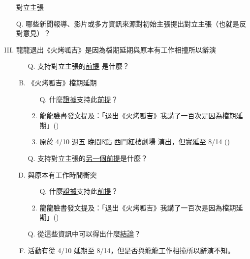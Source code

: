\documentclass[a4paper, 12pt]{article}
\begin{document}
\begin{enumerate}[I.]
\begin{enumerate}[A.]
\begin{enumerate}[1.]
                    \end{enumerate}
          \end{enumerate}
    \item [] {\color{red}對立主張}
    \item [Q.] 哪些新聞報導、影片或多方資訊來源對初始主張提出對立主張（也就是反對意見）？
    \item 龍龍退出《火烤呱吉》是因為檔期延期與原本有工作相撞所以辭演
          \begin{enumerate}[A.]
              \item [Q.] 支持{\color{red}對立主張}的{\underline{前提}} 是什麼？
              \item 《火烤呱吉》檔期延期
                    \begin{enumerate}[1.]
                        \item [Q.] 什麼{\underline{證據}}支持此{\underline{前提}}？
                        \item 龍龍臉書發文提及：「退出《火烤呱吉》我講了一百次是因為檔期延期」(\cite{2091700,froggyroast})
                        \item 原於 4/10 週五 晚間8點 西門紅樓劇場 演出，但實延至 8/14 (\cite{10158175426336462,froggyroast})
                    \end{enumerate}
              \item [Q.] 支持{\color{red}對立主張}的{\underline{另一個前提}}是什麼？
              \item 與原本有工作時間衝突
                    \begin{enumerate}[1.]
                        \item [Q.] 什麼{\underline{證據}}支持此{\underline{前提}}？
                        \item 龍龍臉書發文提及：「退出《火烤呱吉》我講了一百次是因為檔期延期」(\cite{2091700,froggyroast})
                    \end{enumerate}
              \item [Q.] 從這些資訊中可以得出什麼{\underline{結論}}？
              \item 活動有從 4/10 延期至 8/14，但是否與龍龍工作相撞所以辭演不知。
          \end{enumerate}


\end{enumerate}
\end{document}
